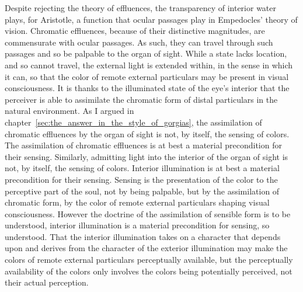 Despite rejecting the theory of effluences, the transparency of interior water plays, for Aristotle, a function that ocular passages play in Empedocles' theory of vision. Chromatic effluences, because of their distinctive magnitudes, are commensurate with ocular passages. As such, they can travel through such passages and so be palpable to the organ of sight. While a state lacks location, and so cannot travel, the external light is extended within, in the sense in which it can, so that the color of remote external particulars may be present in visual consciousness. It is thanks to the illuminated state of the eye's interior that the perceiver is able to assimilate the chromatic form of distal particulars in the natural environment. As I argued in chapter~\ref{sec:the_answer_in_the_style_of_gorgias}, the assimilation of chromatic effluences by the organ of sight is not, by itself, the sensing of colors. The assimilation of chromatic effluences is at best a material precondition for their sensing. Similarly, admitting light into the interior of the organ of sight is not, by itself, the sensing of colors. Interior illumination is at best a material precondition for their sensing. Sensing is the presentation of the color to the perceptive part of the soul, not by being palpable, but by the assimilation of chromatic form, by the color of remote external particulars shaping visual consciousness. However the doctrine of the assimilation of sensible form is to be understood, interior illumination is a material precondition for sensing, so understood. That the interior illumination takes on a character that depends upon and derives from the character of the exterior illumination may make the colors of remote external particulars perceptually available, but the perceptually availability of the colors only involves the colors being potentially perceived, not their actual perception.  


